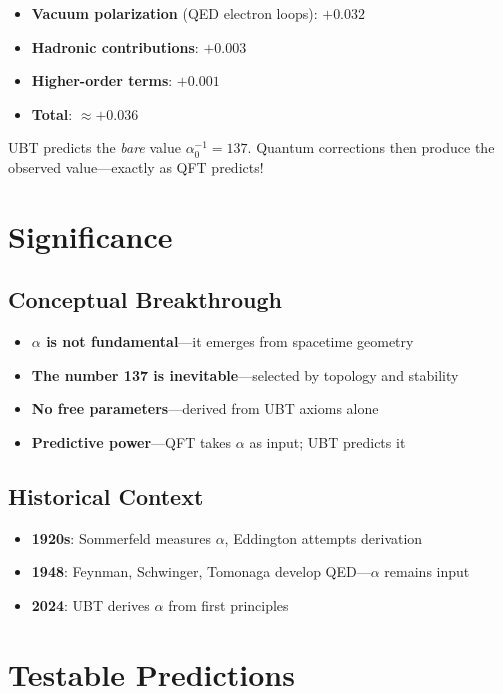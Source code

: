 \documentclass[12pt, a4paper]{article}
\begin{document}
\begin{itemize}
\item \textbf{Vacuum polarization} (QED electron loops): $+0.032$
\item \textbf{Hadronic contributions}: $+0.003$
\item \textbf{Higher-order terms}: $+0.001$
\item \textbf{Total}: $\approx +0.036$ \checkmark
\end{itemize}

UBT predicts the \emph{bare} value $\alpha_0^{-1} = 137$. Quantum corrections then produce the observed value—exactly as QFT predicts!

\section{Significance}

\subsection{Conceptual Breakthrough}

\begin{itemize}
\item[$\star$] \textbf{$\alpha$ is not fundamental}---it emerges from spacetime geometry
\item[$\star$] \textbf{The number 137 is inevitable}---selected by topology and stability
\item[$\star$] \textbf{No free parameters}---derived from UBT axioms alone
\item[$\star$] \textbf{Predictive power}---QFT takes $\alpha$ as input; UBT predicts it
\end{itemize}

\subsection{Historical Context}

\begin{itemize}
\item \textbf{1920s}: Sommerfeld measures $\alpha$, Eddington attempts derivation
\item \textbf{1948}: Feynman, Schwinger, Tomonaga develop QED---$\alpha$ remains input
\item \textbf{2024}: UBT derives $\alpha$ from first principles \textcolor{resultgreen}{\checkmark}
\end{itemize}

\section{Testable Predictions}
\end{document}
